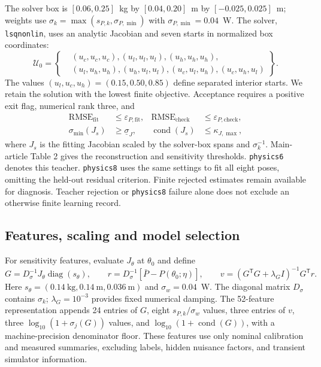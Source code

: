 \documentclass[12pt,a4paper]{article}
\begin{document}
The solver box is $[0.06,0.25]$~kg by $[0.04,0.20]$~m by
$[-0.025,0.025]$~m; weights use $\sigma_k=\max(s_{P,k},\sigma_{P,\min})$ with $\sigma_{P,\min}=0.04$~W.
The solver, \texttt{lsqnonlin}, uses an analytic Jacobian and seven starts
in normalized box coordinates:
\begin{equation}
 \mathcal U_0=\left\{\begin{aligned}
 &(u_c,u_c,u_c),(u_l,u_l,u_l),(u_h,u_h,u_h),\\
 &(u_l,u_h,u_h),(u_h,u_l,u_l),(u_c,u_l,u_h),(u_c,u_h,u_l)
 \end{aligned}\right\}.
 \label{eq:inverse_starts}
\end{equation}
The values $(u_l,u_c,u_h)=(0.15,0.50,0.85)$ define separated interior
starts. We retain the solution with the lowest finite objective.
Acceptance requires a positive exit flag, numerical rank three, and
\begin{equation}
 \begin{aligned}
 \mathrm{RMSE}_{\mathrm{fit}}&\leq\varepsilon_{P,\mathrm{fit}},&
 \mathrm{RMSE}_{\mathrm{check}}&\leq\varepsilon_{P,\mathrm{check}},\\
 \sigma_{\min}(J_s)&\geq\underline\sigma_J,&
 \operatorname{cond}(J_s)&\leq\kappa_{J,\max},
 \end{aligned}
 \label{eq:inverse_acceptance}
\end{equation}
where $J_s$ is the fitting Jacobian scaled by the solver-box spans and
$\sigma_k^{-1}$. Main-article Table 2 gives the reconstruction and
sensitivity thresholds. \texttt{physics6} denotes this teacher. \texttt{physics8} uses the
same settings to fit all eight poses, omitting the held-out residual
criterion. Finite rejected estimates remain available for diagnosis.
Teacher rejection or \texttt{physics8} failure alone does not exclude an otherwise
finite learning record.


\subsection{Features, scaling and model selection}
For sensitivity features, evaluate $J_\theta$ at $\theta_0$ and define
\begin{equation}
 G=D_\sigma^{-1}J_\theta\operatorname{diag}(s_\theta),\qquad
 r=D_\sigma^{-1}[\bar P-P(\theta_0;\eta)],\qquad
 v=(G^{\mathsf T}G+\lambda_G I)^{-1}G^{\mathsf T}r.
 \label{eq:pnn_features}
\end{equation}
Here $s_\theta=(0.14~\mathrm{kg},0.14~\mathrm m,0.036~\mathrm m)$ and
$\sigma_w=0.04$~W. The diagonal matrix $D_\sigma$ contains $\sigma_k$;
$\lambda_G=10^{-3}$ provides fixed numerical damping. The 52-feature
representation appends 24 entries of $G$, eight $s_{P,k}/\sigma_w$
values, three entries of $v$, three $\log_{10}(1+\sigma_j(G))$ values,
and $\log_{10}(1+\operatorname{cond}(G))$, with a machine-precision
denominator floor. These features use only nominal calibration and measured
summaries, excluding labels, hidden nuisance factors, and transient
simulator information.
\end{document}

